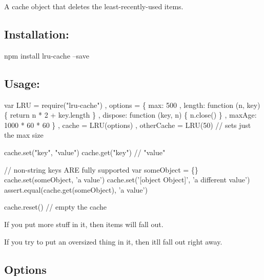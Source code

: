 A cache object that deletes the least-\/recently-\/used items.

\href{https://travis-ci.org/isaacs/node-lru-cache}{\tt } \href{https://coveralls.io/github/isaacs/node-lru-cache}{\tt }

\subsection*{Installation\+:}


\begin{DoxyCode}
npm install lru-cache --save
\end{DoxyCode}


\subsection*{Usage\+:}


\begin{DoxyCode}
var LRU = require("lru-cache")
  , options = \{ max: 500
              , length: function (n, key) \{ return n * 2 + key.length \}
              , dispose: function (key, n) \{ n.close() \}
              , maxAge: 1000 * 60 * 60 \}
  , cache = LRU(options)
  , otherCache = LRU(50) // sets just the max size

cache.set("key", "value")
cache.get("key") // "value"

// non-string keys ARE fully supported
var someObject = \{\}
cache.set(someObject, 'a value')
cache.set('[object Object]', 'a different value')
assert.equal(cache.get(someObject), 'a value')

cache.reset()    // empty the cache
\end{DoxyCode}


If you put more stuff in it, then items will fall out.

If you try to put an oversized thing in it, then it\textquotesingle{}ll fall out right away.

\subsection*{Options}



